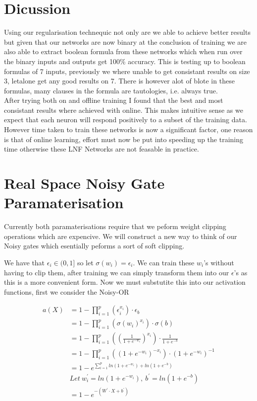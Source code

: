 \documentclass{article}
\theoremstyle{definition}
\begin{document}
\section{Dicussion}
Using our regularisation technequic not only are we able to achieve better results but given that our networks are now binary at the conclusion of training we are also able to extract boolean formula from these networks which when run over the binary inputs and outputs get 100\% accuracy. This is testing up to boolean formulas of 7 inputs, previously we where unable to get consistant results on size 3, letalone get any good results on 7. There is however alot of blote in these formulas, many clauses in the formula are tautologies, i.e. always true. \\

After trying both on and offline training I found that the best and most consistant results where achieved with online. This makes intuitive sense as we expect that each neuron will respond positively to a subset of the training data.\\

However time taken to train these networks is now a significant factor, one reason is that of online learning, effort must now be put into speeding up the training time otherwise these LNF Networks are not feasable in practice.

\section{Real Space Noisy Gate Paramaterisation}
Currently both paramaterisations require that we peform weight clipping operations which are expencive. We will construct a new way to think of our Noisy gates which esentially peforms a sort of soft clipping.

We have that $\epsilon_i \in (0, 1]$ so let $\sigma(w_i) = \epsilon_i$. We can train these $w_i$'s without having to clip them, after training we can simply transform them into our $\epsilon$'s as this is a more convenient form. Now we must substutite this into our activation functions, first we consider the Noisy-OR

\begin{align*}
a(X) &= 1 - \prod^p_{i=1}(\epsilon_i^{x_i}) \cdot \epsilon_b\\
&= 1 - \prod^p_{i=1}(\sigma(w_i)^{x_i}) \cdot \sigma(b)\\
&= 1 - \prod^p_{i=1}((\frac{1}{1 + e^{-w_i}})^{x_i}) \cdot \frac{1}{1 + e^{-b}}\\
&= 1 - \prod^p_{i=1}((1 + e^{-w_i})^{-x_i}) \cdot (1 + e^{-w_i})^{-1}\\
&= 1 - e^{\sum^p_{i=1} ln(1 + e^{-w_i}) + ln(1 + e^{-b})} \\
&Let\ w_i^{'} = ln(1 + e^{-w_i}),\ b^{'} = ln(1 + e^{-b})\\
&= 1 - e^{-(W^{'} \cdot X + b^{'})}
\end{align*}
\end{document}
